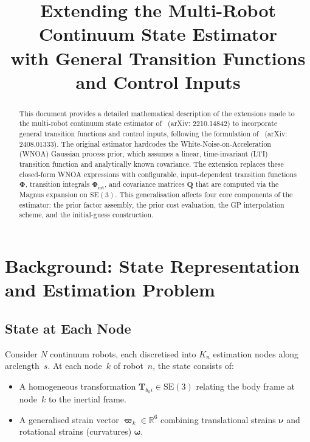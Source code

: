 \documentclass[11pt,a4paper]{article}
\title{Extending the Multi-Robot Continuum State Estimator\\
with General Transition Functions and Control Inputs}
\author{}
\date{}
\newcommand{\SE}{\mathrm{SE}(3)}
\newcommand{\R}{\mathbb{R}}
\newcommand{\T}{\mathbf{T}}
\newcommand{\bvarpi}{\bm{\varpi}}
\newcommand{\bPhi}{\bm{\Phi}}
\newcommand{\bQ}{\mathbf{Q}}
\begin{document}
\maketitle

\begin{abstract}
This document provides a detailed mathematical description of the extensions made to the multi-robot continuum state estimator of~\cite{lilge2022multi} (arXiv: 2210.14842) to incorporate general transition functions and control inputs, following the formulation of~\cite{lilge2024pcr} (arXiv: 2408.01333).
The original estimator hardcodes the White-Noise-on-Acceleration (WNOA) Gaussian process prior, which assumes a linear, time-invariant (LTI) transition function and analytically known covariance.
The extension replaces these closed-form WNOA expressions with configurable, input-dependent transition functions $\bPhi$, transition integrals $\bPhi_{\mathrm{int}}$, and covariance matrices $\bQ$ that are computed via the Magnus expansion on $\SE$.
This generalisation affects four core components of the estimator: the prior factor assembly, the prior cost evaluation, the GP interpolation scheme, and the initial-guess construction.
\end{abstract}

\section{Background: State Representation and Estimation Problem}
\label{sec:background}

\subsection{State at Each Node}
Consider $N$ continuum robots, each discretised into $K_n$ estimation nodes along arclength~$s$.
At each node~$k$ of robot~$n$, the state consists of:
\begin{itemize}
    \item A homogeneous transformation $\T_{b_k i} \in \SE$ relating the body frame at node~$k$ to the inertial frame.
    \item A generalised strain vector $\bvarpi_k \in \R^6$ combining translational strains $\bm{\nu}$ and rotational strains (curvatures) $\bm{\omega}$.
\end{itemize}
\end{document}
